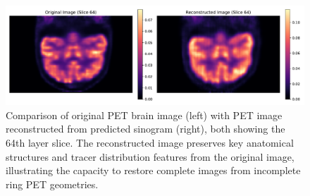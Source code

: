 \documentclass[12pt]{iopart}
\begin{document}
\begin{figure}[ht]
    \centering
    \includegraphics[width=\textwidth]{Images/compare_reconstruction_restoration}
    \vspace{-1cm}
    \caption{Comparison of original PET brain image (left) with PET image reconstructed from predicted sinogram (right), both showing the 64th layer slice. The reconstructed image preserves key anatomical structures and tracer distribution features from the original image, illustrating the capacity to restore complete images from incomplete ring PET geometries. 
    }
    \label{fig:pet_brain_reconstruction}
\end{figure}

\end{document}
